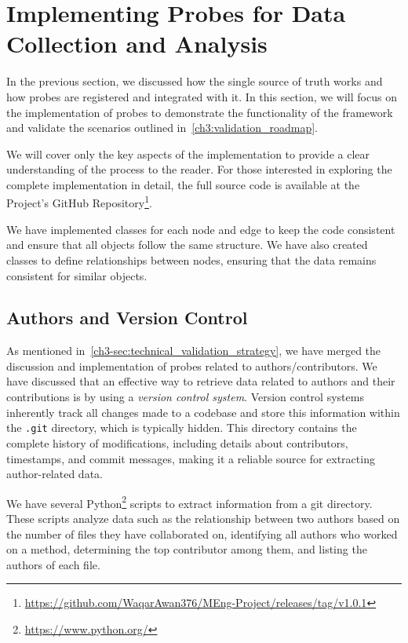 \section{Implementing Probes for Data Collection and Analysis}\label{sec:probes_implementation}

In the previous section, we discussed how the single source of truth works and how probes are registered and integrated with it. In this section, we will focus on the implementation of probes to demonstrate the functionality of the framework and validate the scenarios outlined in~\autoref{ch3:validation_roadmap}.  

We will cover only the key aspects of the implementation to provide a clear understanding of the process to the reader. For those interested in exploring the complete implementation in detail, the full source code is available at the Project's GitHub Repository\footnote{\url{https://github.com/WaqarAwan376/MEng-Project/releases/tag/v1.0.1}}.

We have implemented classes for each node and edge to keep the code consistent and ensure that all objects follow the same structure. We have also created classes to define relationships between nodes, ensuring that the data remains consistent for similar objects.

\subsection{Authors and Version Control}

As mentioned in~\autoref{ch3-sec:technical_validation_strategy}, we have merged the discussion and implementation of probes related to authors/contributors. We have discussed that an effective way to retrieve data related to authors and their contributions is by using a \textit{version control system}. Version control systems inherently track all changes made to a codebase and store this information within the \texttt{.git} directory, which is typically hidden. This directory contains the complete history of modifications, including details about contributors, timestamps, and commit messages, making it a reliable source for extracting author-related data.

We have several Python\footnote{\url{https://www.python.org/}} scripts to extract information from a git directory. These scripts analyze data such as the relationship between two authors based on the number of files they have collaborated on, identifying all authors who worked on a method, determining the top contributor among them, and listing the authors of each file.

